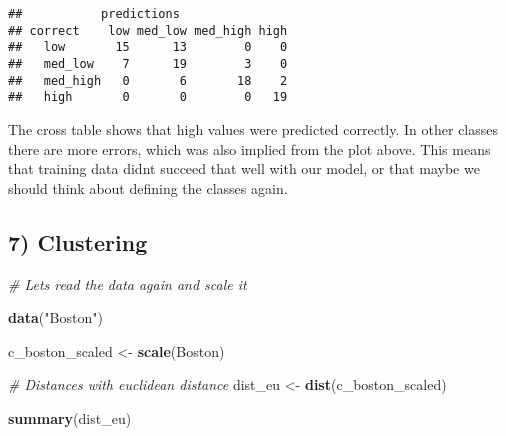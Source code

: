 \documentclass[]{article}
\newenvironment{Shaded}{\begin{snugshade}}{\end{snugshade}}
\newcommand{\KeywordTok}[1]{\textcolor[rgb]{0.13,0.29,0.53}{\textbf{#1}}}
\newcommand{\DataTypeTok}[1]{\textcolor[rgb]{0.13,0.29,0.53}{#1}}
\newcommand{\StringTok}[1]{\textcolor[rgb]{0.31,0.60,0.02}{#1}}
\newcommand{\CommentTok}[1]{\textcolor[rgb]{0.56,0.35,0.01}{\textit{#1}}}
\newcommand{\OperatorTok}[1]{\textcolor[rgb]{0.81,0.36,0.00}{\textbf{#1}}}
\newcommand{\NormalTok}[1]{#1}
\begin{document}
\begin{Shaded}
\end{Shaded}

\begin{verbatim}
##           predictions
## correct    low med_low med_high high
##   low       15      13        0    0
##   med_low    7      19        3    0
##   med_high   0       6       18    2
##   high       0       0        0   19
\end{verbatim}

The cross table shows that high values were predicted correctly. In
other classes there are more errors, which was also implied from the
plot above. This means that training data didnt succeed that well with
our model, or that maybe we should think about defining the classes
again.

\subsection{7) Clustering}\label{clustering}

\begin{Shaded}
\begin{Highlighting}[]
\CommentTok{# Lets read the data again and scale it}

\KeywordTok{data}\NormalTok{(}\StringTok{"Boston"}\NormalTok{)}

\NormalTok{c_boston_scaled <-}\StringTok{ }\KeywordTok{scale}\NormalTok{(Boston)}

\CommentTok{# Distances with euclidean distance}
\NormalTok{dist_eu <-}\StringTok{ }\KeywordTok{dist}\NormalTok{(c_boston_scaled)}

\KeywordTok{summary}\NormalTok{(dist_eu)}
\end{Highlighting}
\end{Shaded}
\end{document}
